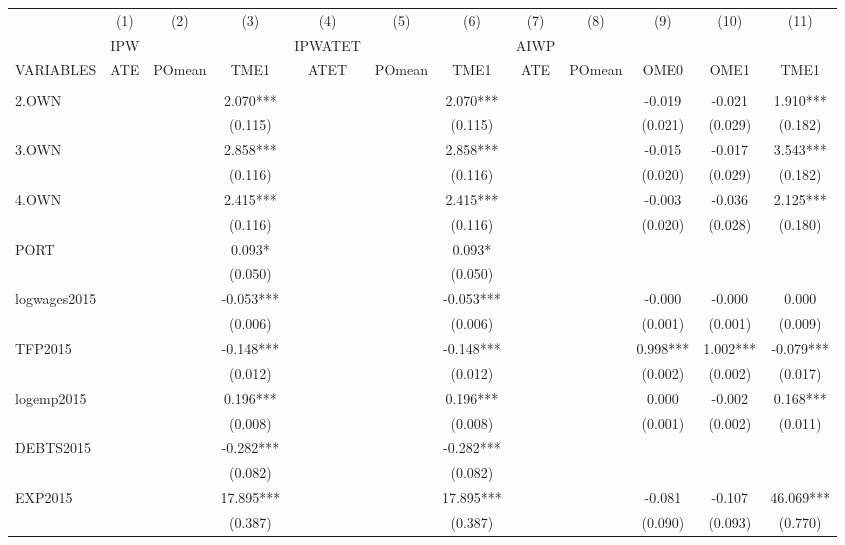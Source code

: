 \documentclass[]{article}
\begin{document}
\begin{landscape}
\centering
\begin{adjustbox}{width=1.8\textwidth}
\begin{tabular}{lccccccccccc} \hline
 & (1) & (2) & (3) & (4) & (5) & (6) & (7) & (8) & (9) & (10) & (11) \\
 & IPW &  &  & IPWATET &  &  & AIWP &  &  &  &  \\
VARIABLES & ATE & POmean & TME1 & ATET & POmean & TME1 & ATE & POmean & OME0 & OME1 & TME1 \\ \hline
 &  &  &  &  &  &  &  &  &  &  &  \\
2.OWN &  &  & 2.070*** &  &  & 2.070*** &  &  & -0.019 & -0.021 & 1.910*** \\
 &  &  & (0.115) &  &  & (0.115) &  &  & (0.021) & (0.029) & (0.182) \\
3.OWN &  &  & 2.858*** &  &  & 2.858*** &  &  & -0.015 & -0.017 & 3.543*** \\
 &  &  & (0.116) &  &  & (0.116) &  &  & (0.020) & (0.029) & (0.182) \\
4.OWN &  &  & 2.415*** &  &  & 2.415*** &  &  & -0.003 & -0.036 & 2.125*** \\
 &  &  & (0.116) &  &  & (0.116) &  &  & (0.020) & (0.028) & (0.180) \\
PORT &  &  & 0.093* &  &  & 0.093* &  &  &  &  &  \\
 &  &  & (0.050) &  &  & (0.050) &  &  &  &  &  \\
logwages2015 &  &  & -0.053*** &  &  & -0.053*** &  &  & -0.000 & -0.000 & 0.000 \\
 &  &  & (0.006) &  &  & (0.006) &  &  & (0.001) & (0.001) & (0.009) \\
TFP2015 &  &  & -0.148*** &  &  & -0.148*** &  &  & 0.998*** & 1.002*** & -0.079*** \\
 &  &  & (0.012) &  &  & (0.012) &  &  & (0.002) & (0.002) & (0.017) \\
logemp2015 &  &  & 0.196*** &  &  & 0.196*** &  &  & 0.000 & -0.002 & 0.168*** \\
 &  &  & (0.008) &  &  & (0.008) &  &  & (0.001) & (0.002) & (0.011) \\
DEBTS2015 &  &  & -0.282*** &  &  & -0.282*** &  &  &  &  &  \\
 &  &  & (0.082) &  &  & (0.082) &  &  &  &  &  \\
EXP2015 &  &  & 17.895*** &  &  & 17.895*** &  &  & -0.081 & -0.107 & 46.069*** \\
 &  &  & (0.387) &  &  & (0.387) &  &  & (0.090) & (0.093) & (0.770) \\

\end{tabular}
\end{adjustbox}
\end{landscape}
\end{document}
